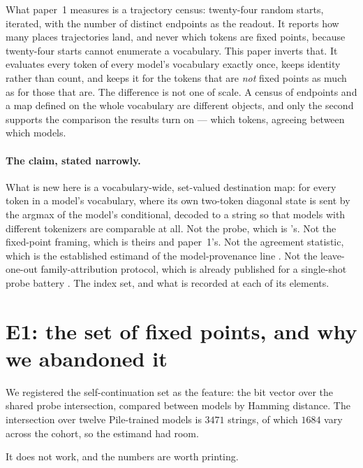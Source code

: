 \documentclass[11pt]{article}
\begin{document}
What paper~1 measures is a trajectory census: twenty-four random starts, iterated, with the number of
distinct endpoints as the readout. It reports how many places trajectories land, and never which
tokens are fixed points, because twenty-four starts cannot enumerate a vocabulary. This paper inverts
that. It evaluates every token of every model's vocabulary exactly once, keeps identity rather than
count, and keeps it for the tokens that are \emph{not} fixed points as much as for those that are.
The difference is not one of scale. A census of endpoints and a map defined on the whole vocabulary
are different objects, and only the second supports the comparison the results turn on --- which
tokens, agreeing between which models.

\paragraph{The claim, stated narrowly.}
What is new here is a vocabulary-wide, set-valued destination map: for every token in a model's
vocabulary, where its own two-token diagonal state is sent by the argmax of the model's conditional,
decoded to a string so that models with different tokenizers are comparable at all. Not the probe,
which is \citet{hammouri2025nonhalting}'s. Not the fixed-point framing, which is theirs and
paper~1's. Not the agreement statistic, which is the established estimand of the model-provenance
line \citep{stemma2026,mpt2025}. Not the leave-one-out family-attribution protocol, which is already
published for a single-shot probe battery \citep{onetoken2026}. The index set, and what is recorded
at each of its elements.

\section{E1: the set of fixed points, and why we abandoned it}\label{sec:e1}

We registered the self-continuation set as the feature: the bit vector over the shared probe
intersection, compared between models by Hamming distance. The intersection over twelve Pile-trained
models is $3471$ strings, of which $1684$ vary across the cohort, so the estimand had room.

It does not work, and the numbers are worth printing.
\end{document}
